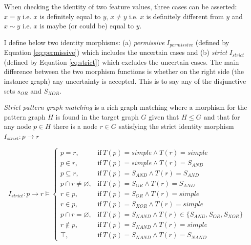 When checking the identity of two feature values, three cases can be asserted: $x=y$ i.e. $x$ is definitely equal to $y$, $x\neq y$ i.e. $x$ is definitely different from $y$ and $x\sim y$ i.e. $x$ is maybe (or could be) equal to $y$. 

I define below two identity morphisms: (a) \textit{permissive} $I_{permissive}$ (defined by Equation \ref{eq:permissive}) which includes the uncertain cases and (b) \textit{strict} $I_{strict}$ (defined by Equation \ref{eq:strict}) which excludes the uncertain cases. The main difference between the two morphism functions is whether on the right side (the instance graph) any uncertainty is accepted. This is to say any of the disjunctive sets $s_{OR}$ and $S_{XOR}$. 

\begin{definition}\label{def:strict-matching}
	\textit{Strict pattern graph matching} is a rich graph matching where a morphism for the pattern graph $H$ is found in the target graph $G$ given that $H \leq G$ and that for any node $p \in H$ there is a node $r \in G$ satisfying the strict identity morphism $I_{strict}:p \rightarrow r$
\end{definition}


\begin{equation} \label{eq:strict}
	I_{strict}:p \rightarrow r \models
	\begin{cases}
	p = r, & \text{if}\ T(p) = simple \wedge T(r) = simple \\
	p \in r, & \text{if}\ T(p) = simple \wedge T(r) = S_{AND} \\
	p \subseteq r, & \text{if}\ T(p) = S_{AND} \wedge T(r)= S_{AND} \\
	p \cap r \neq \varnothing, & \text{if}\ T(p) = S_{OR} \wedge T(r) = S_{AND}\\
	r \in p, & \text{if}\ T(p) = S_{OR} \wedge T(r) = simple \\
	r \in p, & \text{if}\ T(p) = S_{XOR} \wedge T(r) = simple \\
	p \cap r = \varnothing, & \text{if}\ T(p) = S_{NAND} \wedge T(r) \in \{S_{AND}, S_{OR}, S_{XOR}\} \\
	r \notin p, & \text{if}\ T(p) = S_{NAND} \wedge T(r) = simple \\
	\top, & \text{if}\ T(p) = S_{NAND} \wedge T(r) = S_{NAND}
	\end{cases}
\end{equation}

